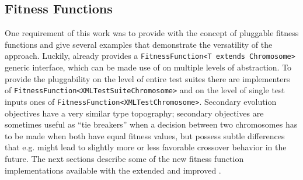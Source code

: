 \subsection{Fitness Functions}
\label{sec:fit}
One requirement of this work was to provide \xmlmate with the concept of pluggable fitness functions and 
give several examples that demonstrate the versatility of the approach. Luckily, \evosuite already provides 
a \texttt{FitnessFunction<T extends Chromosome>} generic interface, which can be made use of on multiple 
levels of abstraction. To provide the pluggability on the level of  entire test suites there are implementers of
\texttt{FitnessFunction<XMLTestSuiteChromosome>} and on the level of single test inputs ones of 
\texttt{FitnessFunction<XMLTestChromosome>}. 
Secondary evolution objectives have a very similar type topography; secondary objectives are sometimes useful 
as ``tie breakers'' when a decision between two chromosomes has to be made when both have equal fitness values,
but possess subtle differences that e.g. might lead to slightly more or less favorable crossover behavior in 
the future. The next sections describe some of the new fitness function implementations available with the 
extended and improved \xmlmate.
